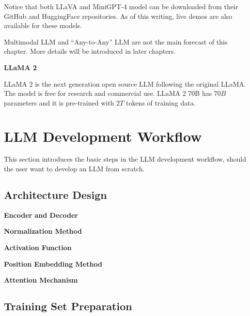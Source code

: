 Notice that both LLaVA and MiniGPT-4 model can be downloaded from their GitHub and HuggingFace repositories. As of this writing, live demos are also available for these models.

Multimodal LLM and ``Any-to-Any'' LLM are not the main forecast of this chapter. More details will be introduced in later chapters.

\vspace{0.1in}
\noindent \textbf{LLaMA 2}
\vspace{0.1in}

LLaMA 2 is the next generation open source LLM following the original LLaMA. The model is free for research and commercial use. LLaMA 2 70B has $70B$ parameters and it is pre-trained with $2T$ tokens of training data.



\section{LLM Development Workflow}

This section introduces the basic steps in the LLM development workflow, should the user want to develop an LLM from scratch.

\subsection{Architecture Design}

\vspace{0.1in}
\noindent \textbf{Encoder and Decoder}
\vspace{0.1in}

\vspace{0.1in}
\noindent \textbf{Normalization Method}
\vspace{0.1in}

\vspace{0.1in}
\noindent \textbf{Activation Function}
\vspace{0.1in}

\vspace{0.1in}
\noindent \textbf{Position Embedding Method}
\vspace{0.1in}

\vspace{0.1in}
\noindent \textbf{Attention Mechanism}
\vspace{0.1in}

\subsection{Training Set Preparation}

